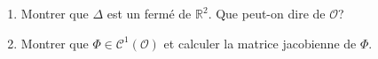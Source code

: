 \documentclass[a4paper]{tp_um}
\begin{document}
\begin{enumerate}
\item Montrer que $\Delta$ est un ferm\'e de $\mathbb R^2.$ Que peut-on dire de $\mathcal O$?




 
\item Montrer que $\Phi \in \mathcal C^1(\mathcal O)$ et calculer la matrice jacobienne de $\Phi.$ 






\end{enumerate}
\end{document}

